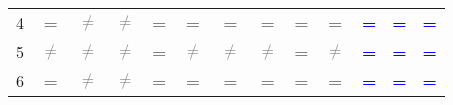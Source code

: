 \begin{table}
\begin{center}
\begin{tabular}{ccccccccccccc}
\multicolumn{1}{c}{4}                                    & \textcolor{gray}{\textbf{=}}                        & \textcolor{gray}{\textbf{$\neq$}}    & \textcolor{gray}{\textbf{$\neq$}}   & \textcolor{gray}{\textbf{=}} & \textcolor{gray}{\textbf{=}}             & \textcolor{gray}{\textbf{=}}          & \textcolor{gray}{\textbf{=}}          & \textcolor{gray}{\textbf{=}}         & \textcolor{gray}{\textbf{=}}          & \textcolor{blue}{\textbf{=}}           & \textcolor{blue}{\textbf{=}}          & \textcolor{blue}{\textbf{=}}  \\ 
\multicolumn{1}{c}{5}                                    & \textcolor{gray}{\textbf{$\neq$}}              & \textcolor{gray}{\textbf{$\neq$}}    & \textcolor{gray}{\textbf{$\neq$}}    & \textcolor{gray}{\textbf{=}} & \textcolor{gray}{\textbf{$\neq$}}  & \textcolor{gray}{\textbf{$\neq$}}   & \textcolor{gray}{\textbf{$\neq$}}   & \textcolor{gray}{\textbf{=}}          & \textcolor{gray}{\textbf{$\neq$}}   & \textcolor{blue}{\textbf{=}}           & \textcolor{blue}{\textbf{=}}          & \textcolor{blue}{\textbf{=}}  \\ 
\multicolumn{1}{c}{6}                                    & \textcolor{gray}{\textbf{=}}                        & \textcolor{gray}{\textbf{$\neq$}}    & \textcolor{gray}{\textbf{$\neq$}}    & \textcolor{gray}{\textbf{=}} & \textcolor{gray}{\textbf{=}}            & \textcolor{gray}{\textbf{=}}          & \textcolor{gray}{\textbf{=}}          & \textcolor{gray}{\textbf{=}}          & \textcolor{gray}{\textbf{=}}         & \textcolor{blue}{\textbf{=}}           & \textcolor{blue}{\textbf{=}}          & \textcolor{blue}{\textbf{=}}  \\ 
\bottomrule
\end{tabular}
\end{center}
\end{table}